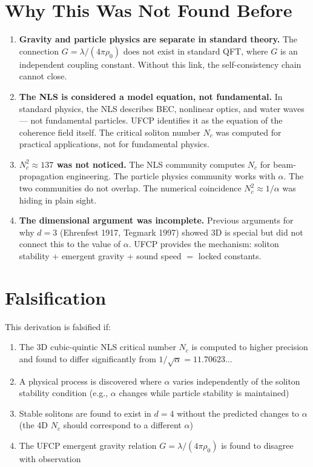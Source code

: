 \documentclass[11pt, a4paper]{article}
\begin{document}
\section{Why This Was Not Found Before}

\begin{enumerate}
  \item \textbf{Gravity and particle physics are separate in
        standard theory.} The connection $G = \lambda/(4\pi\rho_0)$
        does not exist in standard QFT, where $G$ is an
        independent coupling constant. Without this link, the
        self-consistency chain cannot close.

  \item \textbf{The NLS is considered a model equation, not
        fundamental.} In standard physics, the NLS describes
        BEC, nonlinear optics, and water waves --- not
        fundamental particles. UFCP identifies it as the
        equation of the coherence field itself. The critical
        soliton number $N_c$ was computed for practical
        applications, not for fundamental physics.

  \item \textbf{$N_c^2 \approx 137$ was not noticed.} The NLS
        community computes $N_c$ for beam-propagation
        engineering. The particle physics community works with
        $\alpha$. The two communities do not overlap. The
        numerical coincidence $N_c^2 \approx 1/\alpha$ was
        hiding in plain sight.

  \item \textbf{The dimensional argument was incomplete.}
        Previous arguments for why $d = 3$ (Ehrenfest 1917,
        Tegmark 1997) showed 3D is special but did not connect
        this to the value of $\alpha$. UFCP provides the
        mechanism: soliton stability + emergent gravity +
        sound speed $=$ locked constants.
\end{enumerate}

\section{Falsification}

This derivation is falsified if:

\begin{enumerate}[nosep]
  \item The 3D cubic-quintic NLS critical number $N_c$ is
        computed to higher precision and found to differ
        significantly from $1/\sqrt{\alpha} = 11.70623\ldots$
  \item A physical process is discovered where $\alpha$ varies
        independently of the soliton stability condition
        (e.g., $\alpha$ changes while particle stability is
        maintained)
  \item Stable solitons are found to exist in $d = 4$ without
        the predicted changes to $\alpha$ (the 4D $N_c$ should
        correspond to a different $\alpha$)
  \item The UFCP emergent gravity relation
        $G = \lambda/(4\pi\rho_0)$ is found to disagree with
        observation
\end{enumerate}
\end{document}
